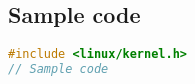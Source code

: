 \documentclass[..thesis.tex]{subfiles}
\begin{document}
\subsection{Sample code}

\label{A:sample-code}
\begin{lstlisting}[language=C,style=def]
#include <linux/kernel.h>
// Sample code
\end{lstlisting}

\newpage
\end{document}
